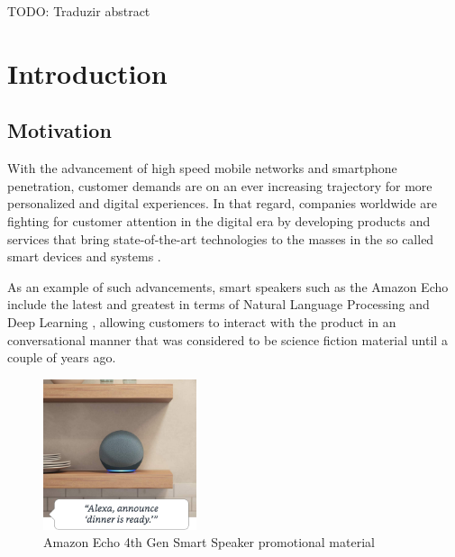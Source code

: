 \documentclass[openright]{normas-utf-tex} %
\begin{document}
\begin{resumo}

TODO: Traduzir abstract

\end{resumo}

\listadefiguras %
\listadetabelas %
\listadesiglas %

\sumario %
%
%
%
%

\setcounter{page}{12}

\chapter{Introduction}

\section{Motivation}

With the advancement of high speed mobile networks and smartphone penetration,
customer demands are on an ever increasing trajectory for more personalized and
digital experiences. In that regard, companies worldwide are fighting for
customer attention in the digital era by developing products and services that
bring state-of-the-art technologies to the masses in the so called smart
devices and systems \cite{Shafique2020}.

As an example of such advancements, smart speakers such as the Amazon Echo
\cite{GaoPanWangChen2018} include the latest and greatest in terms of Natural
Language Processing and Deep Learning \cite{Young2018}, allowing customers to
interact with the product in an conversational manner that was considered to be
science fiction material until a couple of years ago.

\begin{figure}[!htb]
	\centering
	\includegraphics[width=0.4\textwidth]{./images/echodot4.jpg} %
	\caption[Amazon Echo 4th Generation smart speaker promotional material]{Amazon Echo 4th Gen Smart Speaker promotional material}
	\label{fig:echodot4}
\end{figure}
\end{document}
